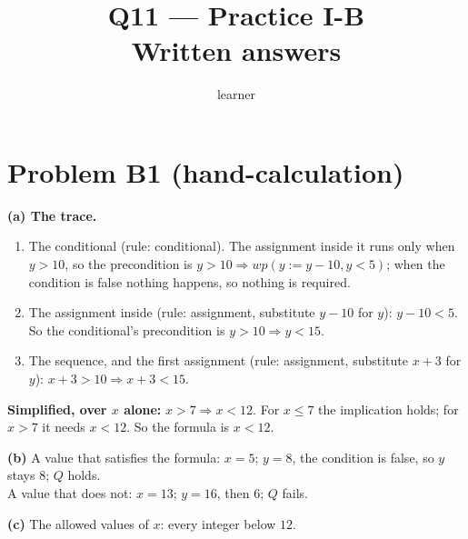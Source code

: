 \documentclass[11pt]{article}
\title{Q11 --- Practice I-B \\ \large Written answers}
\author{learner}
\date{}
\begin{document}
\maketitle
\sloppy

\section*{Problem B1 (hand-calculation)}\label{ans:B1}
\begin{answer}
\textbf{(a) The trace.}
\begin{enumerate}
\item The conditional (rule: conditional). The assignment inside it runs only
  when $y > 10$, so the precondition is $y > 10 \Rightarrow
  \mathit{wp}(y := y - 10, y < 5)$; when the condition is false nothing
  happens, so nothing is required.
\item The assignment inside (rule: assignment, substitute $y - 10$ for $y$):
  $y - 10 < 5$. So the conditional's precondition is $y > 10 \Rightarrow
  y < 15$.
\item The sequence, and the first assignment (rule: assignment, substitute
  $x + 3$ for $y$): $x + 3 > 10 \Rightarrow x + 3 < 15$.
\end{enumerate}
\textbf{Simplified, over $x$ alone:} $x > 7 \Rightarrow x < 12$. For
$x \le 7$ the implication holds; for $x > 7$ it needs $x < 12$. So the
formula is $x < 12$.

\textbf{(b)} A value that satisfies the formula: $x = 5$; $y = 8$, the
condition is false, so $y$ stays $8$; $Q$ holds. \\
A value that does not: $x = 13$; $y = 16$, then $6$; $Q$ fails.

\textbf{(c)} The allowed values of $x$: every integer below $12$.
\end{answer}

\end{document}
